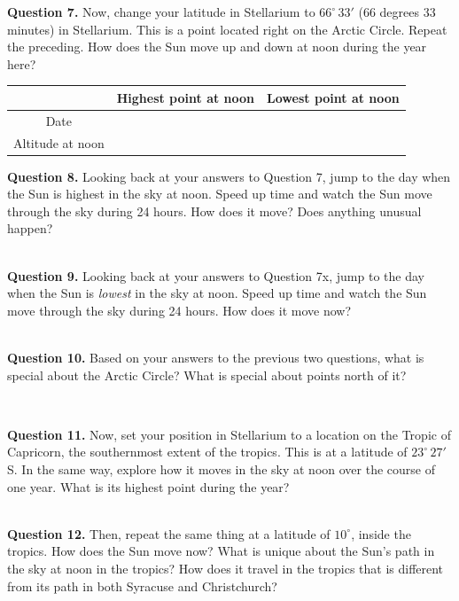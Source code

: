 \documentclass[11pt]{article}
\begin{document}
\textbf{Question 7.} 
Now, change your latitude in Stellarium to $66^\circ\,33'$ (66 degrees 33 minutes) in Stellarium. This is a point located right on the Arctic Circle. Repeat the preceding. How does the 
Sun move up and down at noon during the year here?
\renewcommand{\arraystretch}{2}
\vspace{1cm}
\begin{center}
\begin{tabular}{|c| c |c|}
\hline 
& Highest point at noon & Lowest point at noon \\
\hline
Date & & \\
\hline
Altitude at noon & & \\
\hline
\end{tabular}
\normalsize
\end{center}
\textbf{Question 8.} 
Looking back at your answers to Question 7, jump to the day when the Sun is highest in the sky at noon. Speed up time and watch
the Sun move through the sky during 24 hours. How does it move? Does anything unusual happen?


\vspace*{2cm}
\hrulefill\\


\textbf{Question 9.} 
Looking back at your answers to Question 7x, jump to the day when the Sun is {\it lowest} in the sky at noon. Speed up time and watch
the Sun move through the sky during 24 hours. How does it move now?


\vspace*{2cm}
\hrulefill\\


\textbf{Question 10.} 
Based on your answers to the previous two questions, what is special about the Arctic Circle? What is special about points north
of it?

\vspace*{2cm}
\hrulefill\\


\newpage

\textbf{Question 11.} 
Now, set your position in Stellarium to a location on the Tropic of Capricorn, the southernmost extent of the tropics.
This is at a latitude of $23^\circ\,27'$ S. In the same way, explore how it moves in the sky at noon over the course of one
year. What is its highest point during the year?

\vspace*{2cm}
\hrulefill\\

\textbf{Question 12.}
Then, repeat the same thing at a latitude of $10^\circ$, inside the tropics.
How does the Sun move now? What is unique about the Sun's path in the sky at noon in the tropics? How does it travel in the tropics that is different from its path in both Syracuse and Christchurch?
\end{document}
